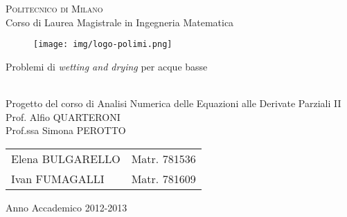 \documentclass[a4paper,12pt,oneside]{book}
\theoremstyle{definition}
\begin{document}

\thispagestyle{empty}
\enlargethispage{60mm}
\begin{center}
\Large{\textsc{Politecnico di Milano}}\\
\large{Corso di Laurea Magistrale in Ingegneria Matematica}\\
\vspace{12mm}
\begin{figure}[h]
\begin{center}
\texttt{[image: img/logo-polimi.png]}
\end{center}
\end{figure}
\vspace{8mm}

\begin{LARGE}
Problemi di \emph{wetting and drying} per acque basse
\end{LARGE} \\
\vspace{10mm}
Progetto del corso di Analisi Numerica delle Equazioni alle Derivate Parziali II \\
\vspace{1.5cm}
Prof. Alfio QUARTERONI\\
Prof.ssa Simona PEROTTO

\vspace{6cm}


\begin{flushright}
\begin{tabular}{l l }
Elena BULGARELLO & Matr. 781536 \\
Ivan FUMAGALLI & Matr. 781609 \\
\end{tabular}
\end{flushright}
\vspace{2cm}
{\large Anno Accademico 2012-2013}
\end{center}
\end{document}
